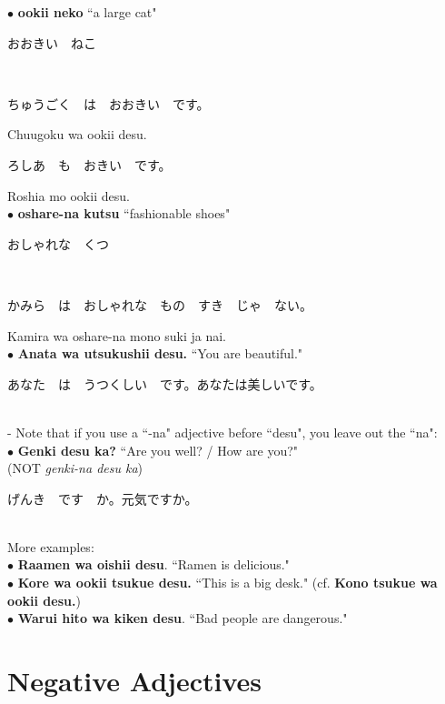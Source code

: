 \documentclass[11pt]{article} %
\newcommand{\ee}{\vspace{.10cm}\\} %
\begin{document}
$\bullet$ \textbf{ookii neko} ``a large cat"\\
\begin{CJK}{UTF8}{min}おおきい　ねこ\end{CJK}\\
\begin{CJK}{UTF8}{min}ちゅうごく　は　おおきい　です。\end{CJK} Chuugoku wa ookii desu.\\
\begin{CJK}{UTF8}{min}ろしあ　も　おきい　です。\end{CJK} Roshia mo ookii desu.\\
$\bullet$ \textbf{oshare-na kutsu} ``fashionable shoes"\\
\begin{CJK}{UTF8}{min}おしゃれな　くつ\end{CJK}\\
\begin{CJK}{UTF8}{min}かみら　は　おしゃれな　もの　すき　じゃ　ない。\end{CJK} Kamira wa oshare-na mono suki ja nai.\ee

$\bullet$ \textbf{Anata wa utsukushii desu.} ``You are beautiful."\\
\begin{CJK}{UTF8}{min}あなた　は　うつくしい　です。あなたは美しいです。\end{CJK}\\
- Note that if you use a ``-na" adjective before ``desu", you leave out the ``na":\\
$\bullet$ \textbf{Genki desu ka?} ``Are you well? / How are you?"\\ (NOT \textit{genki-na desu ka})\\
\begin{CJK}{UTF8}{min}げんき　です　か。元気ですか。\end{CJK}\ee

More examples:\\
$\bullet$ \textbf{Raamen wa oishii desu}.  ``Ramen is delicious."\\
$\bullet$ \textbf{Kore wa ookii tsukue desu.} ``This is a big desk." (cf. \textbf{Kono tsukue wa ookii desu.})\\
$\bullet$ \textbf{Warui hito wa kiken desu}.  ``Bad people are dangerous."\ee

\section{Negative Adjectives}
\end{document}
